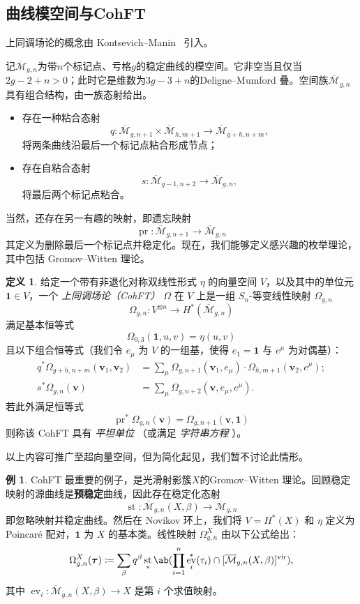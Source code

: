\documentclass{amsart}
\theoremstyle{definition}
\newtheorem{defn}[thm]{定义}
\newtheorem{exm}[thm]{例}
\theoremstyle{remark}
\theoremstyle{plain}
\theoremstyle{definition}
\theoremstyle{remark}
\newcommand{\Mbar}{\overline{\mathcal{M}}}
\newcommand{\mbf}[1]{\mathbf{#1}}
\newcommand{\bv}{\mbf{v}}
\newcommand{\btau}{\bm{\tau}}
\newcommand{\mr}[1]{\mathrm{#1}}
\newcommand{\1}{\mathbf{1}}
\newcommand{\2}{\mathbf{2}}
\newcommand{\3}{\mathbf{3}}
\newcommand{\vir}{\mr{vir}}
\DeclareMathOperator{\ev}{ev}
\DeclareMathOperator{\st}{st}
\DeclareMathOperator{\pr}{pr}
\begin{document}
\subsection{曲线模空间与CohFT}%
\label{sub:Moduli of curves and CohFTs}

上同调场论的概念由 Kontsevich--Manin~\cite{KM1994} 引入。

记$\Mbar_{g,n}$为带$n$个标记点、亏格$g$的稳定曲线的模空间。它非空当且仅当$2g-2+n > 0$；此时它是维数为$3g-3+n$的Deligne--Mumford 叠。空间族$\Mbar_{g,n}$具有组合结构，由一族态射给出。
\begin{itemize}
    \item 存在一种粘合态射 
        \[q \colon \Mbar_{g,n+1} \times \Mbar_{h, m+1} \to \Mbar_{g+h,n+m}, \] 
        将两条曲线沿最后一个标记点粘合形成节点；
    \item 存在自粘合态射 \[s \colon \Mbar_{g-1,n+2} \to \Mbar_{g,n},\] 
        将最后两个标记点粘合。
\end{itemize}
当然，还存在另一有趣的映射，即遗忘映射
\[ \pr \colon \Mbar_{g,n+1} \to \Mbar_{g,n} \]
其定义为删除最后一个标记点并稳定化。现在，我们能够定义感兴趣的枚举理论，其中包括 Gromov--Witten 理论。

\begin{defn}
    给定一个带有非退化对称双线性形式 $\eta$ 的向量空间 $V$，以及其中的单位元 $\1 \in V$，一个 \textit{上同调场论（CohFT）} $\Omega$ 在 $V$ 上是一组 $S_n$-等变线性映射 $\Omega_{g,n}$
    \[ \Omega_{g,n} \colon V^{\otimes n} \to H^*(\Mbar_{g,n}) \]
    满足基本恒等式
    \[ \Omega_{0,3}(\1, u,v) = \eta(u,v) \]
且以下组合恒等式（我们令 $e_{\mu}$ 为 $V$ 的一组基，使得 $e_1 = \1$ 与 $e^{\mu}$ 为对偶基）：
    \begin{align*}
        q^* \Omega_{g+h,n+m}(\bv_1, \bv_2) &= \sum_{\mu} \Omega_{g,n+1}(\bv_1, e_{\mu}) \cdot \Omega_{h,m+1}(  \bv_2, e^{\mu} ); \\
        s^* \Omega_{g,n}(\bv) &= \sum_{\mu} \Omega_{g,n+2}(\bv, e_{\mu}, e^{\mu}).
    \end{align*}
若此外满足恒等式
    \[ \pr^*\Omega_{g,n}(\bv) = \Omega_{g,n+1}(\bv,\1) \]
则称该 CohFT 具有 \textit{ 平坦单位 }（或满足 \textit{ 字符串方程 }）。
\end{defn}
以上内容可推广至超向量空间，但为简化起见，我们暂不讨论此情形。

\begin{exm}
    CohFT 最重要的例子，是光滑射影簇$X$的Gromov--Witten 理论。回顾稳定映射的源曲线是\textbf{预稳定}曲线，因此存在稳定化态射
    \[ \st \colon \Mbar_{g,n}(X,\beta) \to \Mbar_{g,n} \]
    即忽略映射并稳定曲线。然后在 Novikov 环上，我们将 $V = H^*(X)$ 和 $\eta$ 定义为 Poincar\'e 配对，$\1$ 为 $X$ 的基本类。线性映射 $\Omega^X_{g,n}$ 由以下公式给出：
    \[ \Omega_{g,n}^X(\btau) \coloneqq \sum_{\beta} q^{\beta} \st_* \ab(\prod_{i=1}^n \ev_i^*(\tau_i) \cap [\Mbar_{g,n}(X,\beta)]^{\vir}), \]
    其中 $\ev_i \colon \Mbar_{g,n}(X,\beta) \to X$ 是第 $i$ 个求值映射。
\end{exm}
\end{document}
